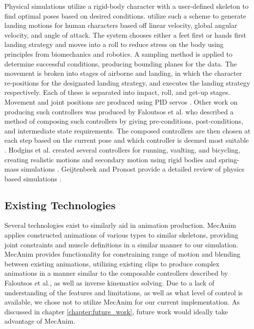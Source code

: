 		
Physical simulations utilize a rigid-body character with a user-defined skeleton to find optimal poses based on desired conditions.  \liufall{} utilize such a scheme to generate landing motions for human characters based off linear velocity, global angular velocity, and angle of attack.  The system chooses either a feet first or hands first landing strategy and moves into a roll to reduce stress on the body using principles from biomechanics and robotics.  A sampling method is applied to determine successful conditions, producing bounding planes for the data.  The movement is broken into stages of airborne and landing, in which the character re-positions for the designated landing strategy, and executes the landing strategy respectively. Each of these is separated into impact, roll, and get-up stages.  Movement and joint positions are produced using PID servos \cite{falling_landing}.  Other work on producing such controllers was produced by Faloutsos et al. who described a method of composing such controllers by giving pre-conditions, post-conditions, and intermediate state requirements.  The composed controllers are then chosen at each step based on the current pose and which controller is deemed most suitable \cite{composable_controllers}.  Hodgins et al. created several controllers for running, vaulting, and bicycling, creating realistic motions and secondary motion using rigid bodies and spring-mass simulations \cite{anim_human_athletics}.  Geijtenbeek and Pronost provide a detailed review of physics based simulations \cite{inter_physics_anim}.

\subsection{Existing Technologies}
Several technologies exist to similarly aid in animation production. \unity{} MecAnim applies constructed animations of various types to similar skeletons, providing joint constraints and muscle definitions in a similar manner to our simulation.  MecAnim provides functionality for constraining range of motion and blending between existing animations, utilizing existing clips to produce complex animations in a manner similar to the composable controllers described by Faloutsos et al., as well as inverse kinematics solving.  Due to a lack of understanding of the features and limitations, as well as what level of control is available, we chose not to utilize MecAnim for our current implementation.  As discussed in chapter \ref{chapter:future_work}, future work would ideally take advantage of MecAnim.

